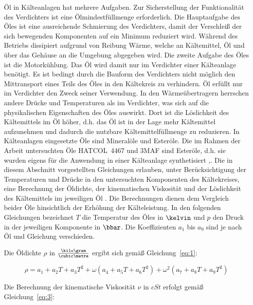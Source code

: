 Öl in Kälteanlagen hat mehrere Aufgaben. Zur Sicherstellung der Funktionalität des Verdichters ist eine Ölmindestfüllmenge erforderlich. Die Hauptaufgabe des Öles ist eine ausreichende Schmierung des Verdichters, damit der Verschleiß der sich bewegenden Komponenten auf ein Minimum reduziert wird.  Während des Betriebs dissipiert aufgrund von Reibung Wärme, welche an Kältemittel, Öl und über das Gehäuse an die Umgebung abgegeben wird. \newline
Die zweite Aufgabe des Öles ist die Motorkühlung. Das Öl wird damit nur im Verdichter einer Kälteanlage benötigt. Es ist bedingt durch die Bauform des Verdichters nicht möglich den Mittransport eines Teils des Öles in den Kältekreis zu verhindern. Öl erfüllt nur im Verdichter den Zweck seiner Verwendung. In den Wärmeübertragern herrschen andere Drücke und Temperaturen als im Verdichter, was sich auf die physikalischen Eigenschaften des Öles auswirkt. Dort ist die Löslichkeit des Kältemittels im Öl höher, d.h. das Öl ist in der Lage mehr Kältemittel aufzunehmen und dadurch die nutzbare Kältemittelfüllmenge zu reduzieren. \newline
In Kälteanlagen eingesetzte Öle sind Mineralöle und Esteröle. Die im Rahmen der Arbeit untersuchten Öle HATCOL~4467 und 3MAF sind Esteröle, d.h. sie wurden eigens für die Anwendung in einer Kälteanlage synthetisiert \cite{ChemturaCorporation.2017},\cite{LubrizolCorporation.2015}. 
Die in diesem Abschnitt vorgestellten Gleichungen erlauben, unter Berücksichtigung der  Temperaturen und Drücke in den untersuchten Komponenten des Kältekreises, eine Berechnung der Öldichte, der kinematischen Viskosität und der Löslichkeit des Kältemittels im jeweiligen Öl \cite{EmersonClimateTechnologies.b}. Die Berechnungen dienen dem Vergleich beider Öle hinsichtlich der Erhöhung der Kälteleistung. In den folgenden Gleichungen bezeichnet $T$ die Temperatur des Öles in $\kelvin$ und $p$ den Druck in der jeweiligen Komponente in $\bbar$. Die Koeffizienten $a_1$ bis $a_9$ sind je nach Öl und Gleichung verschieden.

Die Öldichte $\rho$ in $\frac{\kilo\gram}{\cubic\metre}$ ergibt sich gemäß Gleichung~\ref{eq:1}: 

\begin{equation}
\label{eq:1}
\rho = a_{1} + a_{2}T + a_{3}T^2 + \omega(a_{4}+ a_{5}T + a_{6}T^2) + \omega^2(a_{7}+ a_{8}T + a_{9}T^2)
\end{equation}

Die Berechnung der kinematische Viskosität $\nu$ in $cSt$ erfolgt gemäß Gleichung~\ref{eq:3}:

